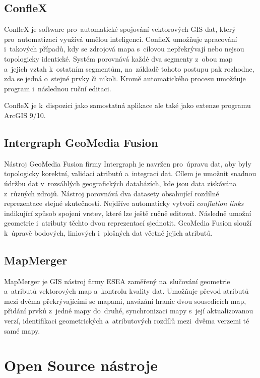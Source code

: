 \subsection{ConfleX}
\label{conflex}

ConfleX je software pro~automatické spojování vektorových GIS dat,
který pro~automatizaci využívá umělou inteligenci. ConfleX umožňuje zpracování 
i~takových případů, kdy se zdrojová mapa s~cílovou nepřekrývají nebo nejsou 
topologicky identické. Systém porovnává každé dva segmenty z~obou map a~jejich
vztah k~ostatním segmentům, na~základě tohoto postupu pak rozhodne, zda se 
jedná o~stejné prvky či nikoli. Kromě automatického procesu umožňuje program 
i~následnou ruční editaci.

ConfleX je k~dispozici jako samostatná aplikace ale také jako extenze 
programu ArcGIS 9/10.

\subsection{Intergraph GeoMedia Fusion}
\label{geomedia}

Nástroj GeoMedia Fusion firmy Intergraph je navržen pro~úpravu dat, aby byly
topologicky korektní, validaci atributů a~integraci dat. Cílem je umožnit 
snadnou údržbu dat v~rozsáhlých geografických databázích, kde jsou data 
získávána z~různých zdrojů. Nástroj porovnává dva datasety obsahující 
rozdílné reprezentace stejné skutečnosti. Nejdříve automaticky vytvoří 
\textit{conflation links} indikující způsob spojení vrstev, které lze ještě
ručně editovat. Následně umožní geometrie i~atributy těchto dvou reprezentací
sjednotit. GeoMedia Fusion slouží k~úpravě bodových, liniových i~plošných dat
včetně jejich atributů.


\subsection{MapMerger}
\label{mapmerger}

MapMerger je GIS nástroj firmy ESEA zaměřený na~slučování geometrie a~atributů
vektorových map a~kontrolu kvality dat. Umožňuje převod atributů mezi dvěma 
překrývajícími se mapami, navázání hranic dvou sousedících map, přidání prvků 
z~jedné mapy do~druhé, synchronizaci mapy s~její aktualizovanou verzí, 
identifikaci geometrických a~atributových rozdílů mezi~dvěma verzemi té samé 
mapy. 

\section{Open Source nástroje}
\label{open-source}

